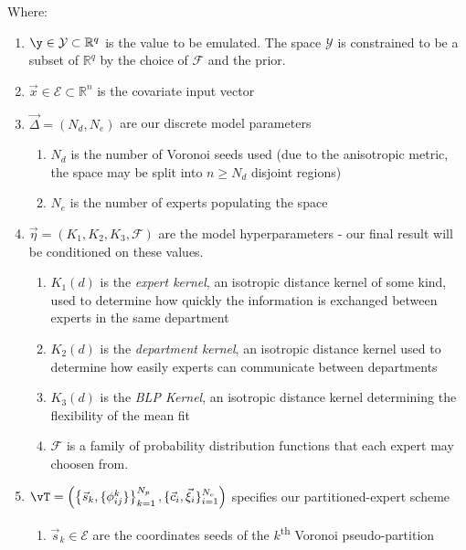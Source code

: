 \begin{table}
			\begin{flushleft}
				\small  Where:
				\begin{enumerate}
					\item $\y \in \mathcal{Y} \subset \mathbb{R}^q$ is the value to be emulated. The space $\mathcal{Y}$ is constrained to be a subset of $\mathbb{R}^q$ by the choice of $\mathcal{F}$ and the prior.
					\item $\vec{x} \in \mathcal{E} \subset \mathbb{R}^n$ is the covariate input vector
					\item $\vec{\Delta} = (N_d,N_e)$ are our discrete model parameters
					      \begin{enumerate}
						      \item $N_d$ is the number of Voronoi seeds used (due to the anisotropic metric, the space may be split into $n \geq N_d$ disjoint regions)
						      \item $N_e$ is the number of experts populating the space
					      \end{enumerate}
					\item $\vec{\eta}= (K_1,K_2,K_3,\mathcal{F})$ are the model hyperparameters - our final result will be conditioned on these values.
					      \begin{enumerate}
						      \item $K_1(d)$ is the \textit{expert kernel}, an isotropic distance kernel of some kind, used to determine how quickly the information is exchanged between experts in the same department
						      \item $K_2(d)$ is the \textit{department kernel}, an isotropic distance kernel used to determine how easily experts can communicate between departments
						      \item $K_3(d)$ is the \textit{BLP Kernel}, an isotropic distance kernel determining the flexibility of the mean fit
						      \item $\mathcal{F}$ is a family of probability distribution functions that each expert may choosen from.
					      \end{enumerate}
					\item $\vT = \left(\left\{\vec{s}_k,\{\phi^k_{ij}\}\right\}_{k=1}^{N_{p}},\{\vec{c}_i, \vec{\xi}_i\}_{i=1}^{N_e}\right)$ specifies our partitioned-expert scheme
					      \begin{enumerate}
						      \item $\vec{s}_k \in \mathcal{E}$ are the coordinates seeds of the $k$\textsuperscript{th} Voronoi pseudo-partition

\end{enumerate}
\end{enumerate}
\end{flushleft}
\end{table}
